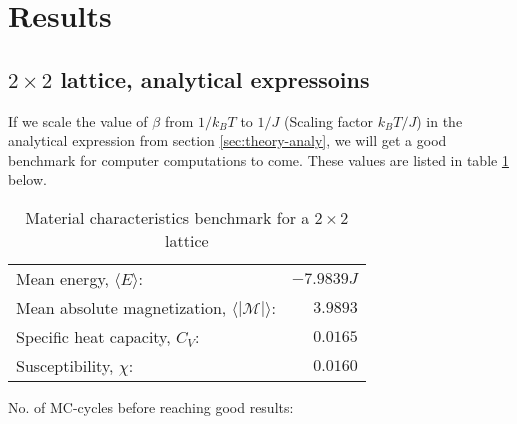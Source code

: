 \documentclass[../main.tex]{subfiles}
\begin{document}
\section{Results}
\subsection{$2 \times 2$ lattice, analytical expressoins}
If we scale the value of $\beta$ from $1/k_BT$ to $1/J$ (Scaling factor $k_B T/J$) in the analytical expression from section \ref{sec:theory-analy}, we will get a good benchmark for computer computations to come. These values are listed in table \ref{tab:2x2spinsEnergiesMags} below.
\begin{table}[!h]
\begin{center}
  \begin{tabular}{l r}
    Mean energy, $\langle E \rangle$: & $-7.9839J$  \\
    Mean absolute magnetization, $\langle |\mathcal{M}| \rangle$: & $3.9893$ \\
    Specific heat capacity, $C_V$: & $0.0165$\\
    Susceptibility, $\chi$: & $0.0160$
  \end{tabular}
  \caption{Material characteristics benchmark for a $2 \times 2$ lattice}
  \label{tab:2x2spinsEnergiesMags}
  No. of MC-cycles before reaching good results: 
\end{center}
\end{table}
\FloatBarrier
\end{document}
